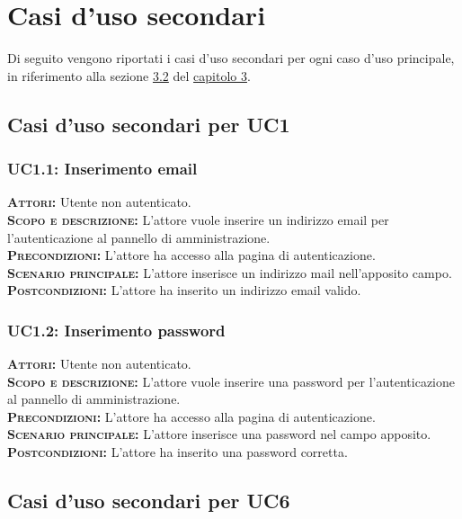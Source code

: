 
\appendix
\cleardoublepage
{}
{}
\chapter{Casi d'uso secondari}
\label{sec:AppendixA}
Di seguito vengono riportati i casi d'uso secondari per ogni caso d'uso principale, in riferimento alla sezione \hyperref[sec:usecase]{3.2} del \hyperref[chap3]{capitolo 3}.
\setlength{\parindent}{0cm}
\section{Casi d'uso secondari per UC1}
\subsection{UC1.1: Inserimento email}
\label{sec:uc11}
\textsc{\textbf{Attori:}} Utente non autenticato.\\
\textsc{\textbf{Scopo e descrizione:}} L'attore vuole inserire un indirizzo email per l'autenticazione al pannello di amministrazione.\\
\textsc{\textsc{\textbf{Precondizioni:}}} L'attore ha accesso alla pagina di autenticazione.\\
\textsc{\textbf{Scenario principale:}} L'attore inserisce un indirizzo mail nell'apposito campo.\\
\textsc{\textbf{Postcondizioni:}} L'attore ha inserito un indirizzo email valido.

\subsection{UC1.2: Inserimento password}
\label{sec:uc12}
\textsc{\textbf{Attori:}} Utente non autenticato.\\
\textsc{\textbf{Scopo e descrizione:}} L'attore vuole inserire una password per l'autenticazione al pannello di amministrazione.\\
\textsc{\textsc{\textbf{Precondizioni:}}} L'attore ha accesso alla pagina di autenticazione.\\
\textsc{\textbf{Scenario principale:}} L'attore inserisce una password nel campo apposito.\\
\textsc{\textbf{Postcondizioni:}} L'attore ha inserito una password corretta.

\section{Casi d'uso secondari per UC6}
